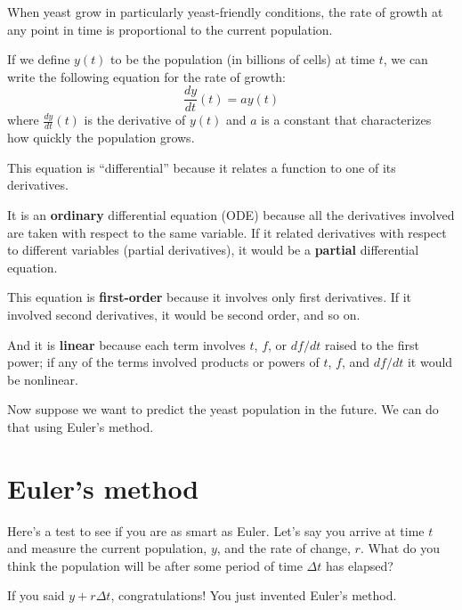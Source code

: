 \documentclass[
]{book}
\numberwithin{Answer}{chapter}
\numberwithin{Exercise}{chapter}
\begin{document}
When yeast grow in particularly yeast-friendly
conditions, the rate of growth at any point in time is proportional to
the current population.

If we define $y(t)$ to be the population (in billions of cells) at 
time $t$, we can write the following equation for the rate of growth:
%
\begin{equation}
\label{eq:exp_growth}
\frac{dy}{dt}(t) = a y(t)
\end{equation}
%
where $\frac{dy}{dt}(t)$ is the derivative of $y(t)$ and
$a$ is a constant that characterizes how quickly the population
grows.

This equation is ``differential'' because it relates a function to one of its derivatives.


It is an {\bf ordinary} differential equation (ODE) because all the
derivatives involved are taken with respect to the
same variable.
If it related derivatives with respect to
different variables (partial derivatives), it would be a {\bf partial}
differential equation.


This equation is {\bf first-order} because it involves only first
derivatives.  If it involved second derivatives, it would be second order,
and so on.


And it is {\bf linear} because each term involves $t$, $f$, or
$df/dt$ raised to the first power; if any of the terms involved
products or powers of $t$, $f$, and $df/dt$ it would be
nonlinear.

Now suppose we want to predict the yeast population in the future.  We can do that using Euler's method.


\section{Euler's method}

Here's a test to see if you are as smart as Euler.  Let's say  you arrive at time $t$ and measure the current population, $y$, and
the rate of change, $r$.  What do you think the population will
be after some period of time $\Delta t$ has elapsed?

If you said $y + r \Delta t$, congratulations!  You just invented
Euler's method.

\end{document}
